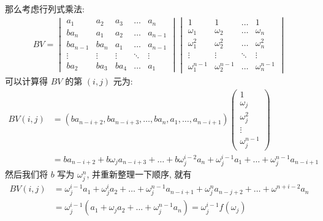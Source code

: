\documentclass{ctexart}
\begin{document}
\begin{exercise}[series=exer]
\begin{answer}
        那么考虑行列式乘法:
        \begin{align*}
            BV = 
            \begin{vmatrix}
                a_{1}   & a_{2} & a_{3} & \ldots    & a_{n} \\
                ba_{n}  & a_{1} & a_{2} & \ldots    & a_{n-1} \\
                ba_{n-1}    & ba_{n}    & a_{1} & \ldots & a_{n-1} \\
                \vdots  & \vdots & \vdots & \ddots & \vdots \\
                ba_{2} & ba_{3} & ba_{4} & \ldots & a_{1}
            \end{vmatrix}
            \begin{vmatrix}
                1 & 1 & \dots & 1\\
                \omega_{1} & \omega_{2} & \dots & \omega_{n}\\
                \omega_{1}^{2} & \omega_{2}^{2} & \dots & \omega_{n}^{2}\\
                \vdots & \vdots & \ddots & \vdots\\
                \omega_{1}^{n-1} & \omega_{2}^{n-1} & \dots & \omega_{n}^{n-1}
            \end{vmatrix}
        \end{align*}
        可以计算得 $ BV $ 的第 $ (i, j) $ 元为:
        \begin{align*}
            BV(i, j) & = (ba_{n-i+2}, ba_{n-i+3}, \dots, ba_{n}, a_{1}, \dots, a_{n-i+1})\begin{pmatrix}
                1 \\ \omega_{j} \\ \omega_{j}^{2} \\ \vdots \\ \omega_{j}^{n-1}
            \end{pmatrix}\\
            & = ba_{n-i+2} + b\omega_{j}a_{n-i+3} + \dots + b\omega_{j}^{i-2}a_{n} + \omega_{j}^{i-1}a_{1} + \dots + \omega_{j}^{n-1}a_{n-i+1}
        \end{align*}
        然后我们将 $ b $ 写为 $ \omega_{j}^{n} $, 并重新整理一下顺序, 就有
        \begin{align*}
            BV(i, j) & = \omega_{j}^{i-1}a_{1} + \omega_{j}^{i}a_{2} + \dots + \omega_{j}^{n-1}a_{n-i+1} + \omega_{j}^{n}a_{n-j+2} + \dots + \omega^{n+i-2}a_{n}\\
            & = \omega_{j}^{i-1}(a_{1} + \omega_{j}a_{2} + \dots + \omega_{j}^{n-1}a_{n}) = \omega_{j}^{i-1}f(\omega_{j})

\end{align*}
\end{answer}
\end{exercise}
\end{document}

